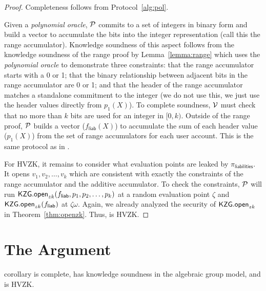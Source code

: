 \begin{proof}
Completeness follows from Protocol~\ref{alg:pol}. 

Given a \textit{polynomial oracle}, $\mathcal{P}$ commits to a set of integers in binary form and build a vector to accumulate the bits into the integer representation (call this the range accumulator). Knowledge soundness of this aspect follows from the knowledge soundness of the range proof by Lemma~\ref{lemma:range} which uses the \textit{polynomial oracle} to demonstrate three constraints: that the range accumulator starts with a 0 or 1; that the binary relationship between adjacent bits in the range accumulator are 0 or 1; and that the header of the range accumulator matches a standalone commitment to the integer (we do not use this, we just use the header values directly from $p_1(X)$). To complete soundness, $\mathcal{V}$ must check that no more than $k$ bits are used for an integer in $[0,k)$. Outside of the range proof, $\mathcal{P}$ builds a vector ($f_\mathsf{liab}(X)$) to accumulate the sum of each header value ($p_1(X)$) from the set of range accumulators for each user account. This is the same protocol as in \poa. 

For HVZK, it remains to consider what evaluation points are leaked by $\pi_\mathsf{liabilities}$. It opens $v_1,v_2,\dots,v_k$ which are consistent with exactly the constraints of the range accumulator and the additive accumulator. To check the constraints, $\mathcal{P}$ will run $\mathsf{KZG.open}_{zk}(f_\mathsf{liab},p_1,p_2,\dots,p_k)$ at a random evaluation point $\zeta$ and $\mathsf{KZG.open}_{zk}(f_\mathsf{liab})$ at $\zeta\omega$. Again, we already analyzed the security of $\mathsf{KZG.open}_{zk}$ in Theorem~\ref{thm:openzk}. Thus, \pol is HVZK.
\end{proof}


\section{The \userproof Argument}

\begin{restatable}{corollary}{}
\label{thm:users} 
\userproof is complete, has knowledge soundness in the algebraic group model, and is HVZK. 
\end{restatable}

